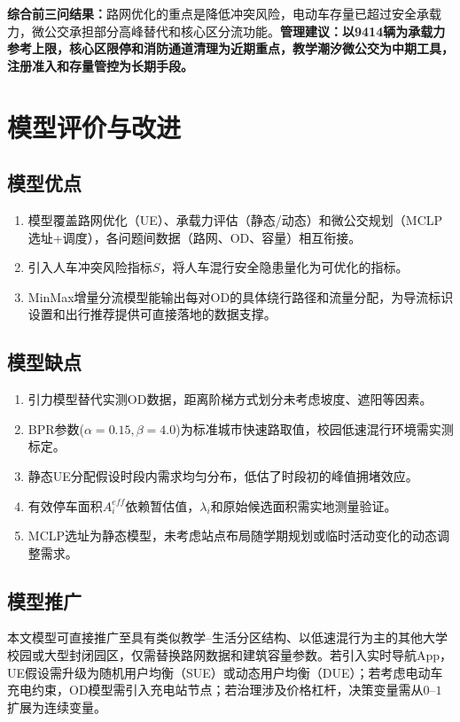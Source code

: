 \documentclass[UTF8,zihao=-4,a4paper]{ctexart}
\numberwithin{table}{section}
\numberwithin{figure}{section}
\numberwithin{equation}{section}
\begin{document}
\textbf{综合前三问结果：}路网优化的重点是降低冲突风险，电动车存量已超过安全承载力，微公交承担部分高峰替代和核心区分流功能。\textbf{管理建议：以9414辆为承载力参考上限，核心区限停和消防通道清理为近期重点，教学潮汐微公交为中期工具，注册准入和存量管控为长期手段。}

\section{模型评价与改进}

\subsection{模型优点}

\begin{enumerate}
\item 模型覆盖路网优化（UE）、承载力评估（静态/动态）和微公交规划（MCLP选址+调度），各问题间数据（路网、OD、容量）相互衔接。
\item 引入人车冲突风险指标$S$，将人车混行安全隐患量化为可优化的指标。
\item MinMax增量分流模型能输出每对OD的具体绕行路径和流量分配，为导流标识设置和出行推荐提供可直接落地的数据支撑。
\end{enumerate}

\subsection{模型缺点}

\begin{enumerate}
\item 引力模型替代实测OD数据，距离阶梯方式划分未考虑坡度、遮阳等因素。
\item BPR参数($\alpha=0.15,\beta=4.0$)为标准城市快速路取值，校园低速混行环境需实测标定。
\item 静态UE分配假设时段内需求均匀分布，低估了时段初的峰值拥堵效应。
\item 有效停车面积$A_i^{eff}$依赖暂估值，$\lambda_i$和原始候选面积需实地测量验证。
\item MCLP选址为静态模型，未考虑站点布局随学期规划或临时活动变化的动态调整需求。
\end{enumerate}

\subsection{模型推广}

本文模型可直接推广至具有类似教学--生活分区结构、以低速混行为主的其他大学校园或大型封闭园区，仅需替换路网数据和建筑容量参数。若引入实时导航App，UE假设需升级为随机用户均衡（SUE）或动态用户均衡（DUE）；若考虑电动车充电约束，OD模型需引入充电站节点；若治理涉及价格杠杆，决策变量需从$0$--$1$扩展为连续变量。
\end{document}
